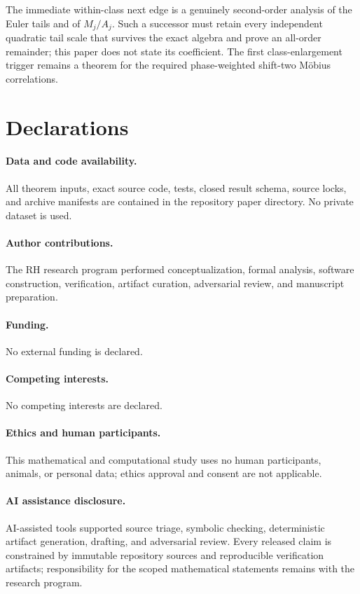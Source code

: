 \documentclass[11pt]{article}
\theoremstyle{definition}
\theoremstyle{remark}
\begin{document}
The immediate within-class next edge is a genuinely second-order analysis
of the Euler tails and of $M_j/A_j$.  Such a successor must retain every
independent quadratic tail scale that survives the exact algebra and prove
an all-order remainder; this paper does not state its coefficient.  The
first class-enlargement trigger remains a theorem for the required
phase-weighted shift-two M\"obius correlations.

\section*{Declarations}

\paragraph{Data and code availability.}
All theorem inputs, exact source code, tests, closed result schema, source
locks, and archive manifests are contained in the repository paper
directory.  No private dataset is used.

\paragraph{Author contributions.}
The RH research program performed conceptualization, formal analysis,
software construction, verification, artifact curation, adversarial review,
and manuscript preparation.

\paragraph{Funding.}
No external funding is declared.

\paragraph{Competing interests.}
No competing interests are declared.

\paragraph{Ethics and human participants.}
This mathematical and computational study uses no human participants,
animals, or personal data; ethics approval and consent are not applicable.

\paragraph{AI assistance disclosure.}
AI-assisted tools supported source triage, symbolic checking, deterministic
artifact generation, drafting, and adversarial review.  Every released
claim is constrained by immutable repository sources and reproducible
verification artifacts; responsibility for the scoped mathematical
statements remains with the research program.



\end{document}
